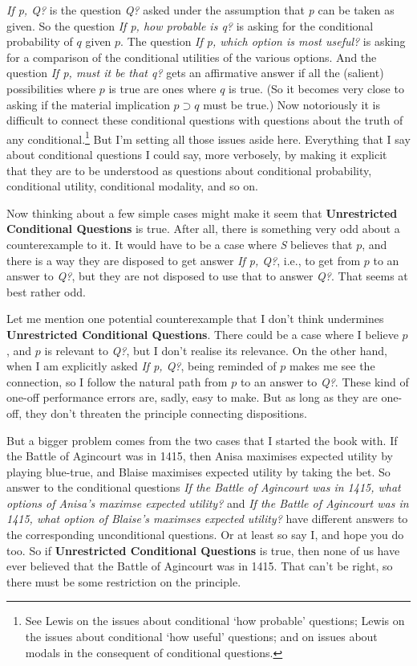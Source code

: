 \documentclass[11pt,]{book}
\let\rmarkdownfootnote\footnote%
\def\footnote{\protect\rmarkdownfootnote}
\begin{document}
\emph{If p, Q?} is the question \emph{Q?} asked under the assumption that \emph{p} can be taken as given. So the question \emph{If p, how probable is q?} is asking for the conditional probability of \(q\) given \(p\). The question \emph{If p, which option is most useful?} is asking for a comparison of the conditional utilities of the various options. And the question \emph{If p, must it be that q?} gets an affirmative answer if all the (salient) possibilities where \(p\) is true are ones where \(q\) is true. (So it becomes very close to asking if the material implication \(p \supset q\) must be true.) Now notoriously it is difficult to connect these conditional questions with questions about the truth of any conditional.\footnote{See Lewis \citetext{\citeyear{Lewis1976b}; \citeyear{Lewis1986h}} on the issues about conditional `how probable' questions; Lewis \citetext{\citeyear{Lewis1988}; \citeyear{Lewis1996}} on the issues about conditional `how useful' questions; and \citet{Gillies2010} on issues about modals in the consequent of conditional questions.} But I'm setting all those issues aside here. Everything that I say about conditional questions I could say, more verbosely, by making it explicit that they are to be understood as questions about conditional probability, conditional utility, conditional modality, and so on.

Now thinking about a few simple cases might make it seem that \textbf{Unrestricted Conditional Questions} is true. After all, there is something very odd about a counterexample to it. It would have to be a case where \emph{S} believes that \(p\), and there is a way they are disposed to get answer \emph{If p, Q?}, i.e., to get from \(p\) to an answer to \emph{Q?}, but they are not disposed to use that to answer \emph{Q?}. That seems at best rather odd.

Let me mention one potential counterexample that I don't think undermines \textbf{Unrestricted Conditional Questions}. There could be a case where I believe \(p\), and \(p\) is relevant to \emph{Q?}, but I don't realise its relevance. On the other hand, when I am explicitly asked \emph{If p, Q?}, being reminded of \(p\) makes me see the connection, so I follow the natural path from \(p\) to an answer to \emph{Q?}. These kind of one-off performance errors are, sadly, easy to make. But as long as they are one-off, they don't threaten the principle connecting dispositions.

But a bigger problem comes from the two cases that I started the book with. If the Battle of Agincourt was in 1415, then Anisa maximises expected utility by playing blue-true, and Blaise maximises expected utility by taking the bet. So answer to the conditional questions \emph{If the Battle of Agincourt was in 1415, what options of Anisa's maximse expected utility?} and \emph{If the Battle of Agincourt was in 1415, what option of Blaise's maximses expected utility?} have different answers to the corresponding unconditional questions. Or at least so say I, and hope you do too. So if \textbf{Unrestricted Conditional Questions} is true, then none of us have ever believed that the Battle of Agincourt was in 1415. That can't be right, so there must be some restriction on the principle.
\end{document}
